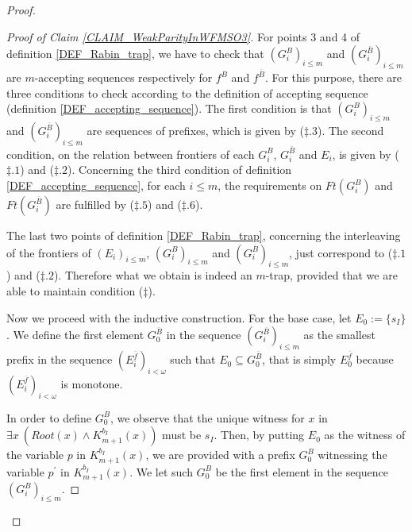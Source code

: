 \begin{proof}
\begin{Iff-LR}
\begin{proof}[Proof of Claim \ref{CLAIM_WeakParityInWFMSO3}]
For points 3 and 4 of definition \ref{DEF_Rabin_trap}, we have to check that $(G_i^{B})_{i\leq m}$ and $(G_i^{\overline{B}})_{i\leq m}$ are $m$-accepting sequences respectively for $f^{B}$ and $f^{\overline{B}}$. For this purpose, there are three conditions to check according to the definition of accepting sequence (definition \ref{DEF_accepting_sequence}). The first condition is that $(G_i^{B})_{i\leq m}$ and $(G_i^{\overline{B}})_{i\leq m}$ are sequences of prefixes, which is given by ($\ddag . 3$). The second condition, on the relation between frontiers of each $G_i^{B}$, $G_i^{\overline{B}}$ and $E_i$, is given by ($\ddag . 1$) and ($\ddag . 2$). Concerning the third condition of definition \ref{DEF_accepting_sequence}, for each $i\leq m$, the requirements on $\mathit{Ft}(G_i^{B})$ and $\mathit{Ft}(G_i^{\overline{B}})$ are fulfilled by ($\ddag . 5$) and ($\ddag . 6$).

The last two points of definition \ref{DEF_Rabin_trap}, concerning the interleaving of the frontiers of $(E_i)_{i\leq m}$, $(G_i^{B})_{i\leq m}$ and $(G_i^{\overline{B}})_{i\leq m}$, just correspond to ($\ddag . 1$) and ($\ddag . 2$). Therefore what we obtain is indeed an $m$-trap, provided that we are able to maintain condition ($\ddag$).

\bigskip

Now we proceed with the inductive construction. For the base case, let $E_0 := \{s_I\}$. We define the first element $G_0^{\overline{B}}$ in the sequence $(G_i^{\overline{B}})_{i\leq m}$ as the smallest prefix in the sequence $(E^{\overline{f}}_i)_{i< \omega}$ such that $E_0 \subseteq G_0^{\overline{B}}$, that is simply $E^{\overline{f}}_0$ because $(E^{\overline{f}}_i)_{i< \omega}$ is monotone.

In order to define $G_0^B$, we observe that the unique witness for $x$ in $\exists x\ (\mathit{Root}(x)\wedge K_{m+1}^{b_I}(x))$ must be $s_I$. Then, by putting $E_0$ as the witness of the variable $p$ in $K_{m+1}^{b_I}(x)$, we are provided with a prefix $G^{B}_0$ witnessing the variable $p^{\prime}$ in $K_{m+1}^{b_I}(x)$. We let such $G^{B}_0$ be the first element in the sequence $(G_i^{B})_{i\leq m}$.


\end{proof}
\end{Iff-LR}
\end{proof}
